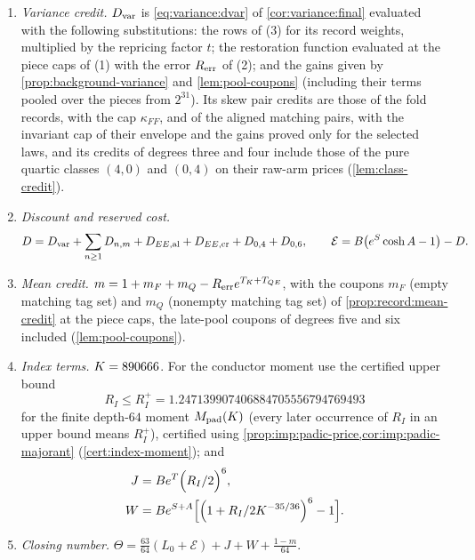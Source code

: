 \begin{definition}
\begin{enumerate}[label=(\arabic*)]
 otherwise its saving is omitted. All sixteen savings are positive.
\item \emph{Variance credit.} $D_{\rm var}$ is \eqref{eq:variance:dvar} of \cref{cor:variance:final} evaluated with the following substitutions: the rows of (3) for its record weights, multiplied by the repricing factor $t$; the restoration function evaluated at the piece caps of (1) with the error $R_{\rm err}$ of (2); and the gains given by \cref{prop:background-variance} and \cref{lem:pool-coupons} (including their terms pooled over the pieces from $2^{31}$). Its skew pair credits are those of the fold records, with the cap
 $\kappa_{FF}$, and of the aligned matching pairs, with the invariant cap of
 their envelope and the gains proved only for the selected laws, and its credits of degrees three
 and four include those of the pure quartic classes $(4,0)$ and $(0,4)$ on their raw-arm prices
 (\cref{lem:class-credit}).
\item \emph{Discount and reserved cost.}
 \[
  D=D_{\rm var}+\sum_{n\ge1}D_{n,m}+D_{EE,{\rm al}}+D_{EE,{\rm cr}}+D_{0,4}+D_{0,6},
  \qquad
  \mathcal E=B\bigl(e^S\cosh A-1\bigr)-D.
 \]
\item \emph{Mean credit.} $m=1+m_F+m_Q-R_{\rm err}e^{T_K+T_{QE}}$, with the
 coupons $m_F$ (empty matching tag set) and $m_Q$ (nonempty matching tag set)
 of \cref{prop:record:mean-credit} at the piece caps, the late-pool coupons of
 degrees five and six included (\cref{lem:pool-coupons}).
\item \emph{Index terms.} $K=890666$. For the conductor moment use the certified upper bound
 \[
 R_I\le R_I^+=1.247139907406884705556794769493
 \]
 for the finite depth-$64$ moment $M_{\rm pad}(K)$ (every later occurrence of $R_I$ in an upper bound means $R_I^+$), certified using
 \cref{prop:imp:padic-price,cor:imp:padic-majorant}
 (\cref{cert:index-moment}); and
 \[
  \begin{aligned}
  J&=Be^T\Bigl(R_I/2\Bigr)^6,\\
  W&=Be^{S+A}\Bigl[\Bigl(1+R_I/2K^{-35/36}\Bigr)^6-1\Bigr].
  \end{aligned}
 \]
\item \emph{Closing number.}
 $\Theta=\frac{63}{64}(L_0+\mathcal E)+J+W+\frac{1-m}{64}$.
\end{enumerate}
\end{definition}

